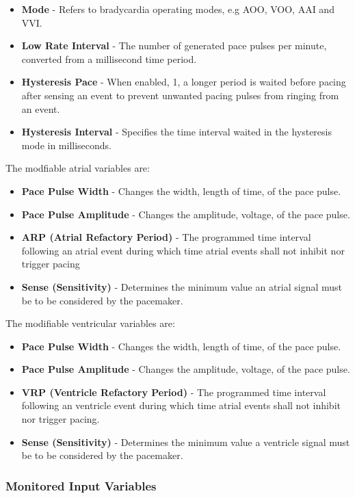 \documentclass{article}
\begin{document}
\begin{itemize}
    \item \textbf{Mode} - Refers to bradycardia operating modes, e.g AOO, VOO, AAI and VVI.
    \item \textbf{Low Rate Interval} - The number of generated pace pulses per minute, converted from a millisecond time period. 
    \item \textbf{Hysteresis Pace} - When enabled, 1, a longer period is waited before pacing after sensing an event to prevent unwanted pacing pulses from ringing from an event. 
    \item \textbf{Hysteresis Interval} - Specifies the time interval waited in the hysteresis mode in milliseconds.
\end{itemize}
The modfiable atrial variables are:

\begin{itemize}
    \item \textbf{Pace Pulse Width} - Changes the width, length of time, of the pace pulse.
    \item \textbf{Pace Pulse Amplitude} - Changes the amplitude, voltage, of the pace pulse.
    \item \textbf{ARP (Atrial Refactory Period)} - The programmed time interval following an atrial event during which time atrial
            events shall not inhibit nor trigger pacing
    \item \textbf{Sense (Sensitivity)} - Determines the minimum value an atrial signal must be to be considered by the pacemaker. 
\end{itemize}
The modifiable ventricular variables are:

\begin{itemize}
    \item \textbf{Pace Pulse Width} - Changes the width, length of time, of the pace pulse.
    \item \textbf{Pace Pulse Amplitude} - Changes the amplitude, voltage, of the pace pulse.
    \item \textbf{VRP (Ventricle Refactory Period)} - The programmed time interval following an ventricle event during which time atrial
            events shall not inhibit nor trigger pacing.
    \item \textbf{Sense (Sensitivity)} - Determines the minimum value a ventricle signal must be to be considered by the pacemaker.
\end{itemize}

\newpage
\subsubsection{Monitored Input Variables}
\end{document}
